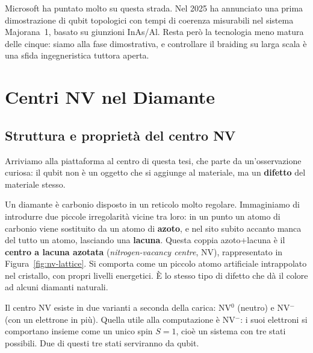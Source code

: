 Microsoft ha puntato molto su questa strada. Nel 2025 ha annunciato una prima
dimostrazione di qubit topologici con tempi di coerenza misurabili nel sistema
Majorana~1, basato su giunzioni InAs/Al. Resta però la tecnologia meno matura
delle cinque: siamo alla fase dimostrativa, e controllare il braiding su larga
scala è una sfida ingegneristica tuttora aperta.

\section{Centri NV nel Diamante}
\label{sec:nv}

\subsection{Struttura e proprietà del centro NV}
\label{subsec:nv-struttura}

Arriviamo alla piattaforma al centro di questa tesi, che parte da
un'osservazione curiosa: il qubit non è un oggetto che si aggiunge al
materiale, ma un \textbf{difetto} del materiale stesso.

Un diamante è carbonio disposto in un reticolo molto regolare. Immaginiamo di
introdurre due piccole irregolarità vicine tra loro: in un punto un atomo di
carbonio viene sostituito da un atomo di \textbf{azoto}, e nel sito subito
accanto manca del tutto un atomo, lasciando una \textbf{lacuna}. Questa coppia
azoto+lacuna è il \textbf{centro a lacuna azotata} (\textit{nitrogen-vacancy
centre}, NV), rappresentato in Figura~\ref{fig:nv-lattice}. Si comporta come un
piccolo atomo artificiale intrappolato nel cristallo, con propri livelli
energetici. È lo stesso tipo di difetto che dà il colore ad alcuni diamanti
naturali.

Il centro NV esiste in due varianti a seconda della carica: NV$^0$ (neutro) e
NV$^-$ (con un elettrone in più). Quella utile alla computazione è NV$^-$: i suoi
elettroni si comportano insieme come un unico spin $S = 1$, cioè un sistema con
tre stati possibili. Due di questi tre stati serviranno da qubit.

